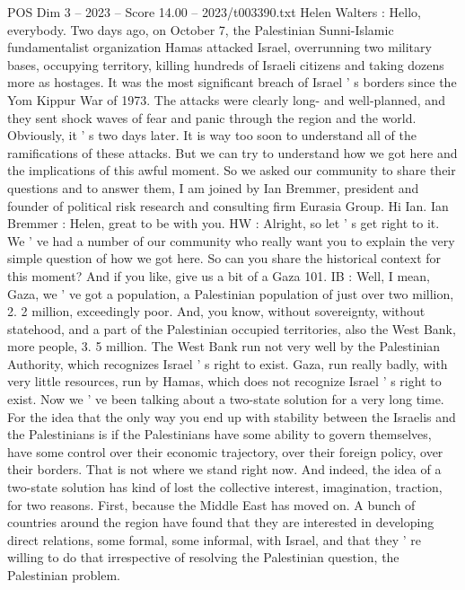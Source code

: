 \begin{textsample}{POS Dim 3 – 2023 – Score 14.00 – 2023/t003390.txt}  \label{ex:f3_pos_039}
Helen Walters : Hello, everybody.
Two days ago, on October 7, the Palestinian Sunni-Islamic fundamentalist organization Hamas attacked Israel, overrunning two military bases, occupying territory, killing hundreds of Israeli citizens and taking dozens more as hostages.
It was the most significant breach of Israel ' s borders since the Yom Kippur War of 1973.
The attacks were clearly long- and well-planned, and they sent shock waves of fear and panic through the region and the world.
Obviously, it ' s two days later.
It is way too soon to understand all of the ramifications of these attacks.
But we can try to understand how we got here and the implications of this awful moment.
So we asked our community to share their questions and to answer them, I am joined by Ian Bremmer, president and founder of political risk research and consulting firm Eurasia Group.
Hi Ian.
Ian Bremmer : Helen, great to be with you.
HW : Alright, so let ' s get right to it.
We ' ve had a number of our community who really want you to explain the very simple question of how we got here.
So can you share the historical context for this moment?
And if you like, give us a bit of a Gaza 101.
IB : Well, I mean, Gaza, we ' ve got a population, a Palestinian population of just over two million, 2. 2 million, exceedingly poor.
And, you know, without sovereignty, without statehood, and a part of the Palestinian occupied territories, also the West Bank, more people, 3. 5 million.
The West Bank run not very well by the Palestinian Authority, which recognizes Israel ' s right to exist.
Gaza, run really badly, with very little resources, run by Hamas, which does not recognize Israel ' s right to exist.
Now we ' ve been talking about a two-state solution for a very long time.
For the idea that the only way you end up with stability between the Israelis and the Palestinians is if the Palestinians have some ability to govern themselves, have some control over their economic trajectory, over their foreign policy, over their borders.
That is not where we stand right now.
And indeed, the idea of a two-state solution has kind of lost the collective interest, imagination, traction, for two reasons.
First, because the Middle East has moved on.
A bunch of countries around the region have found that they are interested in developing direct relations, some formal, some informal, with Israel, and that they ' re willing to do that irrespective of resolving the Palestinian question, the Palestinian problem.

\end{textsample}
